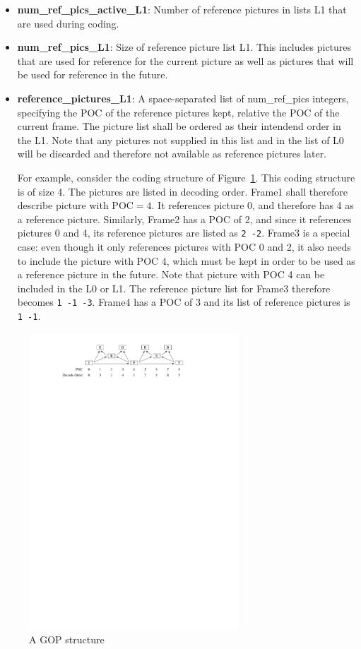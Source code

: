 ﻿\documentclass[a4paper,11pt]{jvetdoc}
\begin{document}
\begin{itemize}
\item[]\textbf{num_ref_pics_active_L1}: Number of reference pictures in lists L1
that are used during coding.

\item[]\textbf{num_ref_pics_L1}: Size of reference picture list L1.
This includes pictures that are used for reference for the
current picture as well as pictures that will be used for reference in
the future.

\item[]\textbf{reference_pictures_L1}: A space-separated list of
num_ref_pics integers, specifying the POC of the reference pictures
kept, relative the POC of the current frame. The picture list shall be
ordered as their intendend order in the L1.
Note that any pictures not supplied in this list and in the list of L0 will be discarded and
therefore not available as reference pictures later.

For example, consider the coding structure of Figure~\ref{fig:gop-example}.
This coding structure is of size 4. The pictures are listed in decoding
order. Frame1 shall therefore describe picture with $\textrm{POC}=4$. It
references picture 0, and therefore has 4 as a reference picture.
Similarly, Frame2 has a POC of 2, and since it references pictures 0 and
4, its reference pictures are listed as \verb|2 -2|. Frame3 is a special
case: even though it only references pictures with POC 0 and 2, it also
needs to include the picture with POC 4, which must be kept in order to
be used as a reference picture in the future. Note that picture with POC 4 can be
included in the L0 or L1. The reference picture list for Frame3 therefore becomes \verb|1 -1 -3|. 
Frame4 has a POC of 3 and its list of reference pictures is \verb|1 -1|.
\end{itemize}

\begin{figure}[h]
\caption{A GOP structure}
\label{fig:gop-example}
\centering
\includegraphics[width=0.7\textwidth]{figures/gop-structure-example}
\end{figure}
\end{document}

